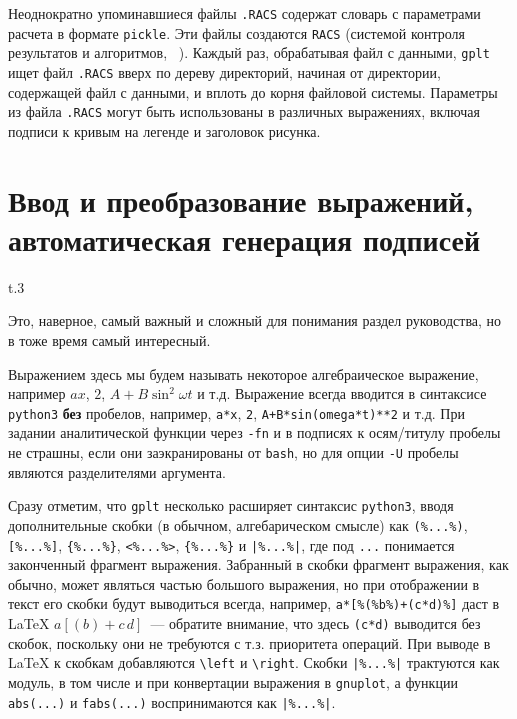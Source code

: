 \documentclass[12pt]{article}
\def\gplt{{\tt gplt}}
\def\gnuplot{{\tt gnuplot}}
\def\python{{\tt python3}}
\begin{document}
Неоднократно упоминавшиеся файлы \verb'.RACS' содержат словарь с параметрами расчета в формате \verb'pickle'.
Эти файлы создаются \verb'RACS' (системой контроля результатов и алгоритмов, ~\cite{aiwlib:SR:PP2018}).
Каждый раз, обрабатывая файл с данными, \gplt{} ищет файл \verb'.RACS' вверх по дереву директорий, начиная от директории, содержащей файл с данными,
и вплоть до корня файловой системы. Параметры из файла \verb'.RACS' могут быть использованы в различных выражениях, включая подписи к кривым на легенде и
заголовок рисунка. 

\section{Ввод и преобразование выражений, автоматическая генерация подписей}
\begin{wrapfigure}[8]{t}{.3\textwidth}
  \vphantom{.}
  \vspace{-1cm}

\end{wrapfigure}
Это, наверное, самый важный и сложный для понимания раздел руководства, но в тоже время самый интересный. 

Выражением здесь мы будем называть некоторое алгебраическое выражение, например $a x$, $2$, $A + B\sin^2\omega t$ и т.д. Выражение всегда вводится
в синтаксисе \python{} {\bf без} пробелов, например, \verb'a*x', \verb'2', \verb'A+B*sin(omega*t)**2' и т.д.
При задании аналитической функции через {\tt -fn} и в подписях к осям/титулу пробелы не страшны, если они
  заэкранированы от {\tt bash}, но для опции {\tt -U} пробелы являются разделителями аргумента. 

  Сразу отметим, что \gplt{} несколько расширяет синтаксис \python{}, вводя дополнительные скобки (в обычном, алгебарическом смысле) как
\verb'(%...%)', \verb'[%...%]', \verb'{%...%}', \verb'<%...%>', \verb'{%...%}' и \verb'|%...%|', где под \verb'...' понимается законченный фрагмент выражения.
Забранный в скобки фрагмент выражения, как обычно, может являться частью большого выражения, но при отображении в текст его скобки будут выводиться всегда, например,
\verb'a*[%(%b%)+(c*d)%]' даст в \LaTeX{}
$a[(b)+c\,d]$~--- обратите внимание, что здесь \verb'(c*d)' выводится без скобок, поскольку они не требуются
с т.з. приоритета операций. При выводе в \LaTeX{} к скобкам добавляются \verb'\left' и \verb'\right'. Скобки \verb'|%...%|' трактуются как модуль,
в том числе и при конвертации выражения в \gnuplot{}, а функции \verb'abs(...)' и \verb'fabs(...)' воспринимаются как \verb'|%...%|'.
\end{document}
